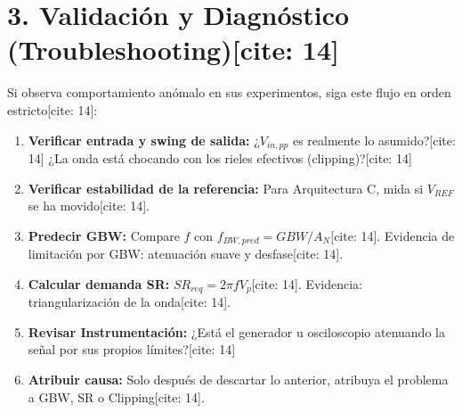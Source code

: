 \documentclass[11pt, a4paper]{article}
\begin{document}
\section*{3. Validación y Diagnóstico (Troubleshooting)[cite: 14]}
Si observa comportamiento anómalo en sus experimentos, siga este flujo en orden estricto[cite: 14]:
\begin{sloppypar}
\begin{enumerate}
    \setlength{\itemsep}{0pt}
    \item \textbf{Verificar entrada y swing de salida:} ¿$V_{in,pp}$ es realmente lo asumido?[cite: 14] ¿La onda está chocando con los rieles efectivos (clipping)?[cite: 14]
    \item \textbf{Verificar estabilidad de la referencia:} Para Arquitectura C, mida si $V_{REF}$ se ha movido[cite: 14].
    \item \textbf{Predecir GBW:} Compare $f$ con $f_{BW,pred} = GBW/A_N$[cite: 14]. Evidencia de limitación por GBW: atenuación suave y desfase[cite: 14].
    \item \textbf{Calcular demanda SR:} $SR_{req} = 2\pi f V_p$[cite: 14]. Evidencia: triangularización de la onda[cite: 14].
    \item \textbf{Revisar Instrumentación:} ¿Está el generador u osciloscopio atenuando la señal por sus propios límites?[cite: 14]
    \item \textbf{Atribuir causa:} Solo después de descartar lo anterior, atribuya el problema a GBW, SR o Clipping[cite: 14].
\end{enumerate}
\end{sloppypar}
\end{document}

